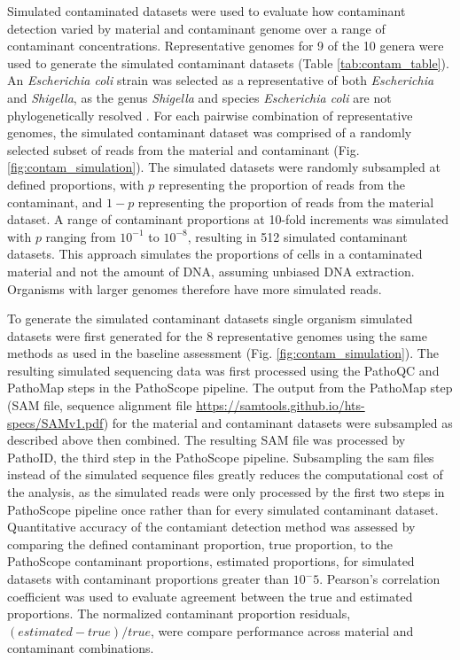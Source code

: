 \documentclass[fleqn,10pt,lineno]{wlpeerj}\usepackage[]{graphicx}\usepackage[]{color}
\begin{document}
Simulated contaminated datasets were used to evaluate how contaminant detection varied by material and contaminant genome over a range of contaminant concentrations.
Representative genomes for 9 of the 10 genera were used to generate the simulated contaminant datasets (Table \ref{tab:contam_table}).
An \textit{Escherichia coli} strain was selected as a representative of both \textit{Escherichia} and \textit{Shigella}, as the genus \textit{Shigella} and species \textit{Escherichia coli} are not phylogenetically resolved \citep{lan2002escherichia}.
For each pairwise combination of representative genomes, the simulated contaminant dataset was comprised of a randomly selected subset of reads from the material and contaminant (Fig. \ref{fig:contam_simulation}).
The simulated datasets were randomly subsampled at defined proportions, with $p$ representing the proportion of reads from the contaminant, and $1-p$ representing the proportion of reads from the material dataset.
A range of contaminant proportions at 10-fold increments was simulated with $p$ ranging from $10^{-1}$ to $10^{-8}$, resulting in 512 simulated contaminant datasets.
This approach simulates the proportions of cells in a contaminated material and not the amount of DNA, assuming unbiased DNA extraction.
Organisms with larger genomes therefore have more simulated reads.


To generate the simulated contaminant datasets single organism simulated datasets were first generated for the 8 representative genomes using the same methods as used in the baseline assessment (Fig. \ref{fig:contam_simulation}).
The resulting simulated sequencing data was first processed using the PathoQC and PathoMap steps in the PathoScope pipeline.
The output from the PathoMap step (SAM file, sequence alignment file \url{https://samtools.github.io/hts-specs/SAMv1.pdf}) for the material and contaminant datasets were subsampled as described above then combined.
The resulting SAM file was processed by PathoID, the third step in the PathoScope pipeline.
Subsampling the sam files instead of the simulated sequence files greatly reduces the computational cost of the analysis, as the simulated reads were only processed by the first two steps in PathoScope pipeline once rather than for every simulated contaminant dataset. 
Quantitative accuracy of the contamiant detection method was assessed by comparing the defined contaminant proportion, true proportion, to the PathoScope contaminant proportions, estimated proportions, for simulated datasets with contaminant proportions greater than $10^-5$. 
Pearson's correlation coefficient was used to evaluate agreement between the true and estimated proportions. 
The normalized contaminant proportion residuals, $(estimated-true)/true$, were compare performance across material and contaminant combinations.
\end{document}
